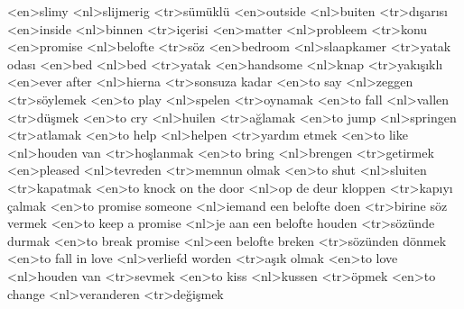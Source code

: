 <en>slimy
<nl>slijmerig
<tr>sümüklü
<en>outside
<nl>buiten
<tr>dışarısı
<en>inside
<nl>binnen
<tr>içerisi
<en>matter
<nl>probleem
<tr>konu
<en>promise
<nl>belofte
<tr>söz
<en>bedroom
<nl>slaapkamer
<tr>yatak odası
<en>bed
<nl>bed
<tr>yatak
<en>handsome
<nl>knap
<tr>yakışıklı
<en>ever after
<nl>hierna
<tr>sonsuza kadar
<en>to say
<nl>zeggen
<tr>söylemek
<en>to play
<nl>spelen
<tr>oynamak
<en>to fall
<nl>vallen
<tr>düşmek
<en>to cry
<nl>huilen
<tr>ağlamak
<en>to jump
<nl>springen
<tr>atlamak
<en>to help
<nl>helpen
<tr>yardım etmek
<en>to like
<nl>houden van
<tr>hoşlanmak
<en>to bring
<nl>brengen
<tr>getirmek
<en>pleased
<nl>tevreden
<tr>memnun olmak
<en>to shut
<nl>sluiten
<tr>kapatmak
<en>to knock on the door
<nl>op de deur kloppen
<tr>kapıyı çalmak
<en>to promise someone
<nl>iemand een belofte doen
<tr>birine söz vermek
<en>to keep a promise
<nl>je aan een belofte houden
<tr>sözünde durmak
<en>to break promise
<nl>een belofte breken
<tr>sözünden dönmek
<en>to fall in love
<nl>verliefd worden
<tr>aşık olmak
<en>to love
<nl>houden van
<tr>sevmek
<en>to kiss
<nl>kussen
<tr>öpmek
<en>to change
<nl>veranderen
<tr>değişmek
